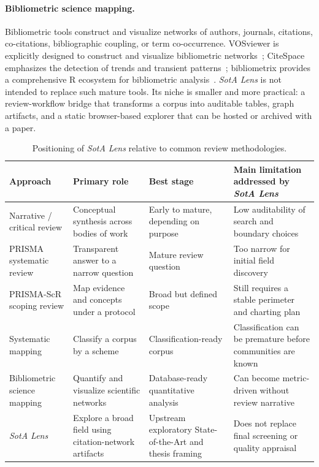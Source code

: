 \documentclass[11pt,a4paper]{article}
\newcommand{\tool}{\emph{SotA Lens}}
\newcommand{\sota}{State-of-the-Art}
\begin{document}
\paragraph{Bibliometric science mapping.}
Bibliometric tools construct and visualize networks of authors, journals, citations, co-citations, bibliographic coupling, or term co-occurrence. VOSviewer is explicitly designed to construct and visualize bibliometric networks~\citep{van2010vosviewer,vosviewerweb}; CiteSpace emphasizes the detection of trends and transient patterns~\citep{chen2006citespace}; bibliometrix provides a comprehensive R ecosystem for bibliometric analysis~\citep{aria2017bibliometrix}. \tool{} is not intended to replace such mature tools. Its niche is smaller and more practical: a review-workflow bridge that transforms a corpus into auditable tables, graph artifacts, and a static browser-based explorer that can be hosted or archived with a paper.

\begin{table}[htbp]
\centering
\small
\begin{tabularx}{\textwidth}{p{2.75cm}XXX}
\toprule
\textbf{Approach} & \textbf{Primary role} & \textbf{Best stage} & \textbf{Main limitation addressed by \tool{}} \\
\midrule
Narrative / critical review & Conceptual synthesis across bodies of work & Early to mature, depending on purpose & Low auditability of search and boundary choices \\
PRISMA systematic review & Transparent answer to a narrow question & Mature review question & Too narrow for initial field discovery \\
PRISMA-ScR scoping review & Map evidence and concepts under a protocol & Broad but defined scope & Still requires a stable perimeter and charting plan \\
Systematic mapping & Classify a corpus by a scheme & Classification-ready corpus & Classification can be premature before communities are known \\
Bibliometric science mapping & Quantify and visualize scientific networks & Database-ready quantitative analysis & Can become metric-driven without review narrative \\
\tool{} & Explore a broad field using citation-network artifacts & Upstream exploratory \sota{} and thesis framing & Does not replace final screening or quality appraisal \\
\bottomrule
\end{tabularx}
\caption{Positioning of \tool{} relative to common review methodologies.}
\label{tab:comparison}
\end{table}
\end{document}
